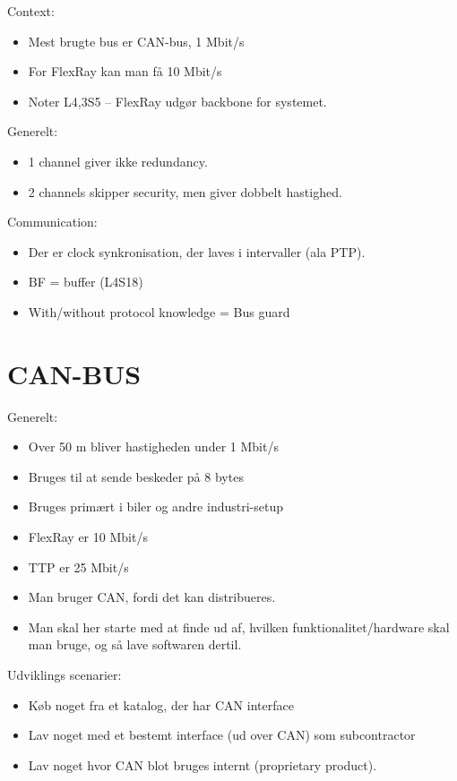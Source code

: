\documentclass[oneside, 10pt]{article}
\begin{document}
Context:
\begin{itemize}
	\item Mest brugte bus er CAN-bus, 1 Mbit/s
	\item For FlexRay kan man få 10 Mbit/s
	\item Noter L4,3S5 -- FlexRay udgør backbone for systemet.
\end{itemize}

Generelt:
\begin{itemize}
	\item 1 channel giver ikke redundancy.
	\item 2 channels skipper security, men giver dobbelt hastighed.
\end{itemize}

Communication:
\begin{itemize}
	\item Der er clock synkronisation, der laves i intervaller (ala PTP).

	\item BF = buffer (L4S18)
	\item With/without protocol knowledge = Bus guard
\end{itemize}






\newpage
\section{CAN-BUS}

Generelt:
\begin{itemize}
	\item Over 50 m bliver hastigheden under 1 Mbit/s
	\item  Bruges til at sende beskeder på 8 bytes
	\item Bruges primært i biler og andre industri-setup
	\item FlexRay er 10 Mbit/s
	\item TTP er 25 Mbit/s 
	\item Man bruger CAN, fordi det kan distribueres.
	\item Man skal her starte med at finde ud af, hvilken funktionalitet/hardware skal man bruge, og så lave softwaren dertil.
\end{itemize}

Udviklings scenarier:
\begin{itemize}
	\item Køb noget fra et katalog, der har CAN interface
	\item Lav noget med et bestemt interface (ud over CAN) som subcontractor
	\item Lav noget hvor CAN blot bruges internt (proprietary product).
\end{itemize}
\end{document}
